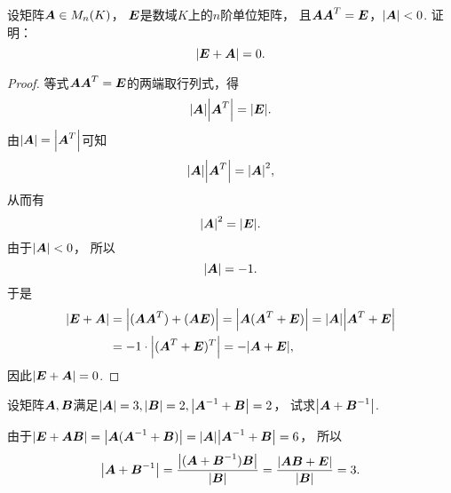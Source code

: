 \begin{example}\label{example:正交矩阵.行列式小于零的正交矩阵与单位矩阵之和的行列式等于零}
设矩阵\(\boldsymbol{A} \in M_n(K)\)，
\(\boldsymbol{E}\)是数域\(K\)上的\(n\)阶单位矩阵，
且\(\boldsymbol{A} \boldsymbol{A}^T = \boldsymbol{E}\)，\(\abs{\boldsymbol{A}}<0\).
证明：\[
	\abs{\boldsymbol{E}+\boldsymbol{A}}=0.
\]
\begin{proof}
等式\(\boldsymbol{A} \boldsymbol{A}^T=\boldsymbol{E}\)的两端取行列式，得\[
	\abs{\boldsymbol{A}} \abs{\boldsymbol{A}^T}
	= \abs{\boldsymbol{E}}.
\]
由\(\abs{\boldsymbol{A}} = \abs{\boldsymbol{A}^T}\)可知\[
	\abs{\boldsymbol{A}} \abs{\boldsymbol{A}^T}
	= \abs{\boldsymbol{A}}^2,
\]
从而有\[
	\abs{\boldsymbol{A}}^2 = \abs{\boldsymbol{E}}.
\]
由于\(\abs{\boldsymbol{A}} < 0\)，
所以\[
	\abs{\boldsymbol{A}} = -1.
\]
于是\begin{align*}
	\abs{\boldsymbol{E}+\boldsymbol{A}}
	&= \abs{(\boldsymbol{A} \boldsymbol{A}^T)+(\boldsymbol{A} \boldsymbol{E})}
	= \abs{\boldsymbol{A}(\boldsymbol{A}^T+\boldsymbol{E})}
	= \abs{\boldsymbol{A}} \abs{\boldsymbol{A}^T+\boldsymbol{E}} \\
	&= -1 \cdot \abs{(\boldsymbol{A}^T+\boldsymbol{E})^T}
	= -\abs{\boldsymbol{A}+\boldsymbol{E}},
\end{align*}
因此\(\abs{\boldsymbol{E}+\boldsymbol{A}}=0\).
\end{proof}
\end{example}

\begin{example}
设矩阵\(\boldsymbol{A},\boldsymbol{B}\)满足\(\abs{\boldsymbol{A}}=3,\abs{\boldsymbol{B}}=2,\abs{\boldsymbol{A}^{-1}+\boldsymbol{B}}=2\)，
试求\(\abs{\boldsymbol{A}+\boldsymbol{B}^{-1}}\).
\begin{solution}
由于\(\abs{\boldsymbol{E}+\boldsymbol{A}\boldsymbol{B}} = \abs{\boldsymbol{A}(\boldsymbol{A}^{-1}+\boldsymbol{B})} = \abs{\boldsymbol{A}} \abs{\boldsymbol{A}^{-1}+\boldsymbol{B}} = 6\)，
所以\[
	\abs{\boldsymbol{A}+\boldsymbol{B}^{-1}}
	= \frac{\abs{(\boldsymbol{A}+\boldsymbol{B}^{-1})\boldsymbol{B}}}{\abs{\boldsymbol{B}}}
	= \frac{\abs{\boldsymbol{A}\boldsymbol{B}+\boldsymbol{E}}}{\abs{\boldsymbol{B}}}
	= 3.
\]
\end{solution}
\end{example}

